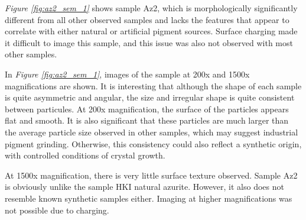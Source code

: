 \textit{Figure \ref{fig:az2_sem_1}} shows sample Az2, which is morphologically significantly different from all other observed samples and lacks the features that appear to correlate with either natural or artificial pigment sources. Surface charging made it difficult to image this sample, and this issue was also not observed with most other samples.

In \textit{Figure \ref{fig:az2_sem_1}}, images of the sample at 200x and 1500x magnifications are shown. It is interesting that although the shape of each sample is quite asymmetric and angular, the size and irregular shape is quite consistent between particules. At 200x magnification, the surface of the particles appears flat and smooth. It is also significant that these particles are much larger than the average particle size observed in other samples, which may suggest industrial pigment grinding. Otherwise, this consistency could also reflect a synthetic origin, with controlled conditions of crystal growth.

At 1500x magnification, there is very little surface texture observed. Sample Az2 is obviously unlike the sample HKI natural azurite. However, it also does not resemble known synthetic samples either. Imaging at higher magnifications was not possible due to charging.

